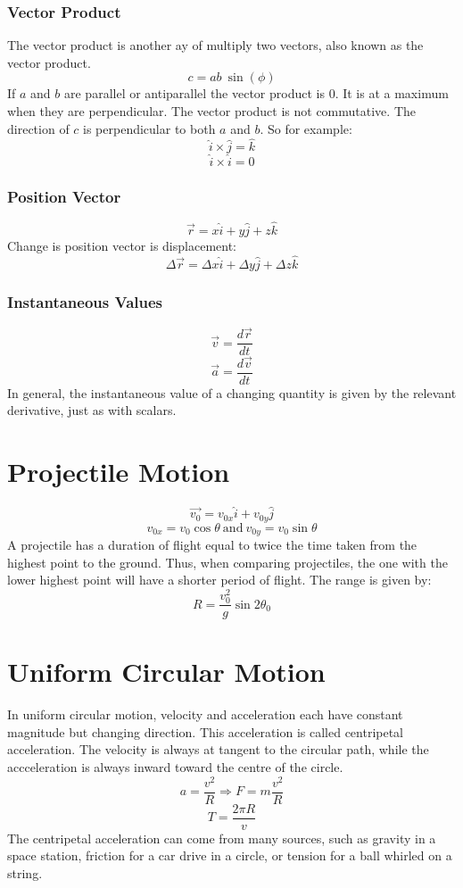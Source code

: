 \documentclass[12pt]{report}
\begin{document}
\begin{flushleft}
\subsubsection*{Vector Product}

The vector product is another ay of multiply two vectors, also known as the 
vector product.
\[c = ab\:\sin(\phi)\]
If \(a\) and \(b\) are parallel or antiparallel the vector product is \(0\).
It is at a maximum when they are perpendicular. The vector product is not 
commutative. The direction of \(c\) is perpendicular to both \(a\) and \(b\).
So for example:
\[\hat{i} \times \hat{j} = \hat{k}\]
\[\hat{i} \times \hat{i} = 0\]

\subsubsection*{Position Vector}
\[\vec{r} = x\hat{i} + y\hat{j} +z\hat{k}\]
Change is position vector is displacement:
\[\Delta\vec{r} = \Delta x \hat{i} + \Delta y \hat{j} + \Delta z \hat{k}\]

\subsubsection*{Instantaneous Values}
\[\vec{v} = \frac{d\vec{r}}{dt}\]
\[\vec{a} = \frac{d\vec{v}}{dt}\]
In general, the instantaneous value of a changing quantity is given by the 
relevant derivative, just as with scalars.

\section*{Projectile Motion}
\[\vec{v_0} = v_{0x}\hat{i} + v_{0y}\hat{j}\]
\[v_{0x} = v_0\cos{\theta} \:\mathrm{and}\: v_{0y} = v_0\sin{\theta}\]
A projectile has a duration of flight equal to twice the time taken from the 
highest point to the ground. Thus, when comparing projectiles, the one with the
lower highest point will have a shorter period of flight. The range is given 
by:
\[R = \frac{v^2_0}{g}\sin 2 \theta_0\]

\section*{Uniform Circular Motion}
In uniform circular motion, velocity and acceleration each have constant 
magnitude but changing direction. This acceleration is called centripetal 
acceleration. The velocity is always at tangent to the circular path, while 
the accceleration is always inward toward the centre of the circle.
\[a = \frac{v^2}{R} \Rightarrow F = m\frac{v^2}{R}\]
\[T = \frac{2\pi R }{v}\]
The centripetal acceleration can come from many sources, such as gravity in a 
space station, friction for a car drive in a circle, or tension for a ball 
whirled on a string.


\end{flushleft}
\end{document}
